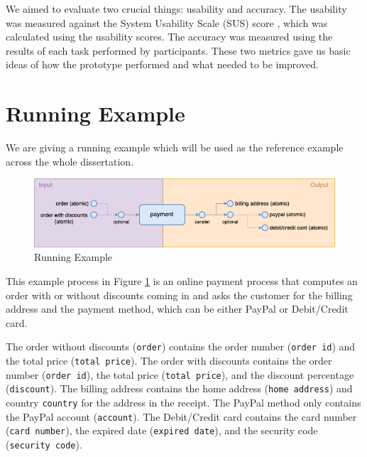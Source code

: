 We aimed to evaluate two crucial things: usability and accuracy. The usability was measured against the System Usability Scale (SUS) score \cite{susscores}, which was calculated using the usability scores. The accuracy was measured using the results of each task performed by participants. These two metrics gave us basic ideas of how the prototype performed and what needed to be improved.


\section{Running Example}
\label{running_example}
We are giving a running example which will be used as the reference example across the whole dissertation.

\begin{figure}[ht!]
    \centering
    \includegraphics[width=\textwidth]{overleaf/images/template_example.png}
    \caption{Running Example}
    \label{fig:template_example}
\end{figure}

This example process in Figure \ref{fig:template_example} is an online payment process that computes an order with or without discounts coming in and asks the customer for the billing address and the payment method, which can be either PayPal or Debit/Credit card.

The order without discounts (\verb!order!) contains the order number (\verb!order id!) and the total price (\verb!total price!). The order with discounts contains the order number (\verb!order id!), the total price (\verb!total price!), and the discount percentage (\verb!discount!).
The billing address contains the home address (\verb!home address!) and country \verb!country! for the address in the receipt. The PayPal method only contains the PayPal account (\verb!account!). The Debit/Credit card contains the card number (\verb!card number!), the expired date (\verb!expired date!), and the security code (\verb!security code!).

